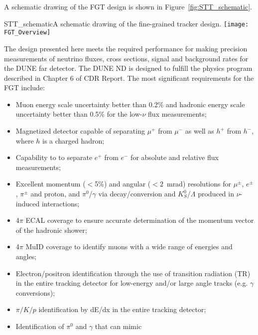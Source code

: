 A schematic drawing of the FGT design is shown in
Figure~\ref{fig:STT_schematic}.
\begin{cdrfigure}{STT_schematic}{A schematic drawing of the fine-grained tracker design.}
\texttt{[image: FGT\_Overview]}
\end{cdrfigure}
The design presented here meets the required performance for making
precision measurements of neutrino fluxes, cross sections, signal and
background rates for the DUNE far detector.  The DUNE ND is designed
to fulfill the physics program described in Chapter 6 of CDR \volphys
Report\cite{DPR}. The most significant
requirements\cite{ND-REQ1,ND-REQ2} for the FGT include:
\begin{itemize}
\item Muon energy scale uncertainty better than 0.2\% and hadronic
  energy scale uncertainty better than 0.5\% for the low-$\nu$ flux
  measurements;
\item Magnetized detector capable of separating $\mu^+$
  from $\mu^-$ as well as $h^+$ from $h^-$, where $h$ is a charged
  hadron;
\item Capability to to separate $e^+$ from $e^-$ for absolute and
  relative flux measurements;
\item Excellent momentum ($<$5\%) and angular ($<2$~mrad) resolutions
  for $\mu^{\pm}$, $e^{\pm}$, $\pi^{\pm}$ and proton, and
  $\pi^0$/$\gamma$ via decay/conversion and $K^0_S$/$\Lambda$
  produced in $\nu$-induced interactions;
\item 4$\pi$ ECAL coverage to ensure accurate determination of the
  momentum vector of the hadronic shower;
\item 4$\pi$ MuID coverage to identify muons with a wide range of
  energies and angles;
\item Electron/positron identification through the use of transition
  radiation (TR) in the entire tracking detector for low-energy and/or
  large angle tracks (e.g. $\gamma$ conversions);
\item $\pi/K/p$ identification by dE/dx in the entire tracking
  detector;
\item Identification of $\pi^0$ and $\gamma$ that can mimic

\end{itemize}
